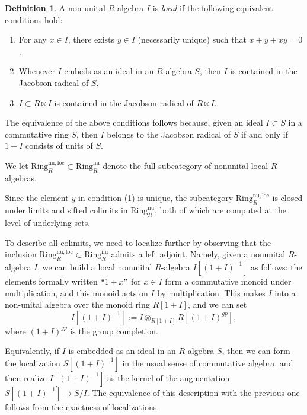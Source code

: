 \documentclass{amsart}
\theoremstyle{definition}
\newtheorem{definition}{Definition}[section]
\newcommand{\nuloc}{\mathrm{Ring}^{\mathrm{nu,loc}}_R}
\newcommand{\nur}{\mathrm{Ring}^{\mathrm{nu}}_R}
\begin{document}
\begin{definition} 
A non-unital $R$-algebra $I$ 
is \emph{local} if the following equivalent conditions
hold: 
\begin{enumerate}
\item  For any $x \in I$, there exists $y \in I$ (necessarily unique) such that $x + y + xy = 0$.
\item Whenever $I$ embeds as an ideal in an $R$-algebra $S$, then $I$ is contained
in the Jacobson radical of $S$. 
\item $I \subset R \ltimes I$ is contained in the Jacobson radical of $R \ltimes
I$. 
\end{enumerate}
The equivalence of the above conditions follows because, given an ideal $I
\subset S$ in a commutative ring $S$, then $I$ belongs to the Jacobson radical of $S$ if and only if $1 + I$
consists of units of $S$. 

We let $\nuloc \subset \nur$ denote the full subcategory of nonunital local 
$R$-algebras. 
\end{definition} 

Since the element $y$ in condition (1) is unique, the subcategory $\nuloc$
is closed under limits and sifted colimits in $\nur$, both of which are computed at the level of underlying sets.

To describe all colimits, we need to localize further by observing that the inclusion $\nuloc \subset \nur$ admits a left adjoint. Namely, given a nonunital $R$-algebra $I$, we can build a local nonunital $R$-algebra $I[(1+I)^{-1}]$ as follows: the elements formally written $``1+x"$ for $x\in I$ form a commutative monoid under multiplication, and this monoid acts on $I$ by multiplication.  This makes $I$ into a non-unital algebra over the monoid ring $R[1+I]$, and we can set
\begin{equation} \label{loccons} I[(1+I)^{-1}] := I\otimes_{R[1+I]}
R[(1+I)^{gp}], \end{equation}
where $(1+I)^{gp}$ is the group completion.

Equivalently, if $I$ is embedded as an ideal in an $R$-algebra $S$, then we can form the localization $S[(1+I)^{-1}]$ in the usual sense of commutative algebra, and then realize $I[(1+I)^{-1}]$ as the kernel of the augmentation $S[(1+I)^{-1}]\rightarrow S/I$.  The equivalence of this description with the previous one follows from the exactness of localizations.
\end{document}
